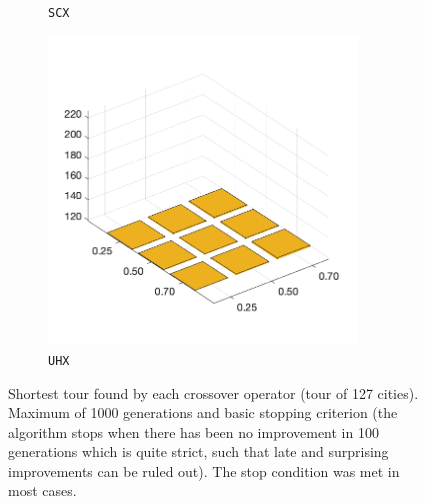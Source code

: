 \begin{figure}[H]
\begin{subfigure}[b]{0.25\textwidth}
		\caption{\texttt{SCX}}
		\label{fig:y}
    	\end{subfigure}
%
	\begin{subfigure}[b]{0.25\textwidth}
		\centering
		\includegraphics[width=0.9\textwidth]{crossover/min/cross_unnamed_3.png}
		\caption{\texttt{UHX}}
		\label{fig:z}
    	\end{subfigure}
	\caption{Shortest tour found by each crossover operator (tour of 127 cities). Maximum of 1000 generations and basic stopping criterion (the algorithm stops when there has been no improvement in 100 generations which is quite strict, such that late and surprising improvements can be ruled out). The stop condition was met in most cases.}
	\label{fig:rescross3}
\end{figure}


